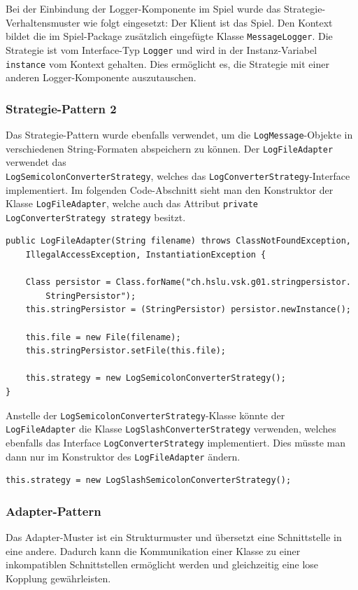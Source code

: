 \documentclass[12pt,a4paper,twosided]{scrartcl}
\begin{document}
Bei der Einbindung der Logger-Komponente im Spiel wurde das Strategie-Verhaltensmuster wie folgt eingesetzt:
Der Klient ist das Spiel. Den Kontext bildet die im Spiel-Package zusätzlich eingefügte Klasse \texttt{MessageLogger}. Die Strategie ist vom
Interface-Typ \texttt{Logger} und wird in der Instanz-Variabel \texttt{instance}
vom Kontext gehalten. Dies ermöglicht es, die Strategie mit einer anderen Logger-Komponente auszutauschen.

\subsubsection{Strategie-Pattern 2}
Das Strategie-Pattern wurde ebenfalls verwendet, um die \texttt{LogMessage}-Objekte in verschiedenen String-Formaten abspeichern zu können. Der \texttt{LogFileAdapter} verwendet das \\ \texttt{LogSemicolonConverterStrategy},
welches das \texttt{LogConverterStrategy}-Interface implementiert. Im folgenden Code-Abschnitt sieht man den Konstruktor der Klasse \texttt{LogFileAdapter}, welche auch das Attribut \texttt{private LogConverterStrategy strategy} besitzt.

\begin{verbatim}
public LogFileAdapter(String filename) throws ClassNotFoundException,
	IllegalAccessException, InstantiationException {
	
	Class persistor = Class.forName("ch.hslu.vsk.g01.stringpersistor.
		StringPersistor");
	this.stringPersistor = (StringPersistor) persistor.newInstance();
	
	this.file = new File(filename);
	this.stringPersistor.setFile(this.file);
	
	this.strategy = new LogSemicolonConverterStrategy();	
}	
\end{verbatim}

\newpage

Anstelle der \texttt{LogSemicolonConverterStrategy}-Klasse könnte der \texttt{LogFileAdapter} die
Klasse \texttt{LogSlashConverterStrategy} verwenden, welches ebenfalls das Interface \texttt{LogConverterStrategy} implementiert. Dies müsste man dann nur im Konstruktor des \texttt{LogFileAdapter} ändern.

\begin{verbatim}
this.strategy = new LogSlashSemicolonConverterStrategy();
\end{verbatim}

\subsubsection{Adapter-Pattern}
Das Adapter-Muster ist ein Strukturmuster und übersetzt eine Schnittstelle in eine andere. Dadurch kann die Kommunikation einer Klasse zu einer inkompatiblen Schnittstellen ermöglicht werden und gleichzeitig eine lose Kopplung gewährleisten.
\end{document}
